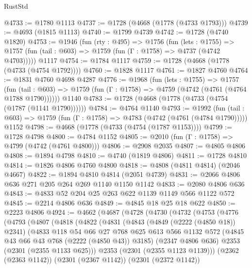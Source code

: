 \begin{lexlean}{RustStd}
\begin{coremodule}
@4733 := @1780 @1113
@4737 := @1728 (@4668 (@1778 (@4733 @1793)))
@4739 := @4693 (@1815 @1113)
@4740 := @1799 @4739
@4742 := @1728 (@4740 @1820)
@4753 := @1946
    (fun (rty : @495) =>
    @1756
      (fun (lets : @1755) =>
      @1757 (fun (tail : @603) => @1759 (fun (Γ : @1758) => @4737 (@4742 @4703)))))
    @1117
@4754 := @1784 @1117
@4759 := @1728 (@4668 (@1778 (@4733 (@4754 @1792))))
@4760 := @1828 @1117
@4761 := @1827 @4760
@4764 := @1831 @4760 @4698 @4287
@4776 := @1968
    (fun (lets : @1755) =>
    @1757
      (fun (tail : @603) => @1759 (fun (Γ : @1758) => @4759 (@4742 (@4761 (@4764 @1788 @1790))))))
    @1140
@4783 := @1728 (@4668 (@1778 (@4733 (@4754 (@1787 (@1141 @1790))))))
@4784 := @4764 @1140
@4793 := @1992
    (fun (tail : @603) => @1759 (fun (Γ : @1758) => @4783 (@4742 (@4761 (@4784 @1790)))))
    @1152
@4798 := @4668 (@1778 (@4733 (@4754 (@1787 @1153))))
@4799 := @1728 @4798
@4800 := @4784 @1152
@4805 := @2010 (fun (Γ : @1758) => @4799 (@4742 (@4761 @4800)))
@4806 := @2908 @2035
@4807 := @4805 @4806
@4808 := @1894 @4798
@4810 := @4740 (@1819 @4806)
@4811 := @1728 @4810
@4814 := @1826 @4806 @4760 @4800
@4818 := @4808 (@4811 @4814) (@2046 @4667)
@4822 := @1894 @4810 @4814 (@2051 @4739)
@4831 := @2066 @4806 @636 @271 @205 @264 @269 @1140 @1150 @1142
@4833 := @2080 @4806 @636
@4843 := @4833 @52 @204 @25 @263 @622 @1139 @1149 @566 @1122 @572
@4845 := @2214 @4806 @636
@4849 := @4845 @18 @25 @18 @622
@4850 := @2223 @4806
@4924 := @4662
    (@4687
      (@4728
        (@4730
          (@4732
            (@4753
              (@4776
                (@4793
                  (@4807
                    (@4818
                      (@4822
                        (@4831
                          (@4843
                            (@4849 (@2222 (@4850 @18)) @2341)
                            (@4833
                              @118
                              @54
                              @66
                              @27
                              @768
                              @625
                              @613
                              @566
                              @1132
                              @572
                              (@4845 @43 @66 @43 @768 (@2222 (@4850 @43)) @3185)
                              (@2347 @4806 @636)
                              @2353
                              (@2301 (@2355 @1133 @625)))
                            @2353
                            (@2301 (@2355 @1123 @1139)))
                          (@2362 (@2363 @1142))
                          (@2301 (@2367 @1142))
                          (@2301 (@2372 @1142))

\end{coremodule}
\end{lexlean}
